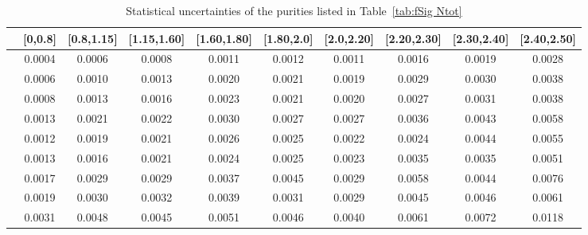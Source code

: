\begin{table}
\footnotesize
\centering
\begin{tabular}{c|c|c|c|c|c|c|c|c|c}
  \hline
   &[0,0.8] &[0.8,1.15] &[1.15,1.60] &[1.60,1.80] &[1.80,2.0] &[2.0,2.20] &[2.20,2.30] &[2.30,2.40] &[2.40,2.50] \\
  \hline
  [0,0.8] &0.0004 &0.0006 &0.0008 &0.0011 &0.0012 &0.0011 &0.0016 &0.0019 &0.0028\\
  \hline
  [0.8,1.15] &0.0006 &0.0010 &0.0013 &0.0020 &0.0021 &0.0019 &0.0029 &0.0030 &0.0038 \\
  \hline
  [1.15,1.60] &0.0008 &0.0013 &0.0016 &0.0023 &0.0021 &0.0020 &0.0027 &0.0031 &0.0038 \\
  \hline
  [1.60,1.80] &0.0013 &0.0021 &0.0022 &0.0030 &0.0027 &0.0027 &0.0036 &0.0043 &0.0058 \\
  \hline
  [1.80,2.0] &0.0012 &0.0019 &0.0021 &0.0026 &0.0025 &0.0022 &0.0024 &0.0044 &0.0055 \\
  \hline
  [2.0,2.20] &0.0013 &0.0016 &0.0021 &0.0024 &0.0025 &0.0023 &0.0035 &0.0035 &0.0051 \\
  \hline
  [2.20,2.30] &0.0017 &0.0029 &0.0029 &0.0037 &0.0045 &0.0029 &0.0058 &0.0044 &0.0076 \\
  \hline
  [2.30,2.40] &0.0019 &0.0030 &0.0032 &0.0039 &0.0031 &0.0029 &0.0045 &0.0046 &0.0061 \\
  \hline
  [2.40,2.50] &0.0031 &0.0048 &0.0045 &0.0051 &0.0046 &0.0040 &0.0061 &0.0072 &0.0118 \\
  \hline
\end{tabular}
\caption{Statistical uncertainties of the purities listed in Table~\ref{tab:fSig Ntot}}
\label{tab:fSig error Ntot}
\end{table}

